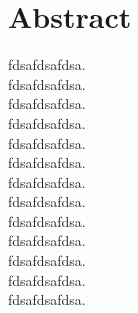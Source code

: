 \section{Abstract}
fdsafdsafdsa. \\ 
fdsafdsafdsa. \\ 
fdsafdsafdsa. \\ 
fdsafdsafdsa. \\ 
fdsafdsafdsa. \\ 
fdsafdsafdsa. \\ 
fdsafdsafdsa. \\ 
fdsafdsafdsa. \\ 
fdsafdsafdsa. \\ 
fdsafdsafdsa. \\ 
fdsafdsafdsa. \\ 
fdsafdsafdsa. \\ 
fdsafdsafdsa. \\ 


